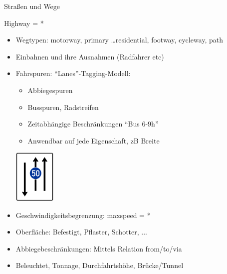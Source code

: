 \documentclass{beamer}
\begin{document}
\begin{frame}{ Straßen und Wege}

Highway = *

\begin{itemize}
  \item Wegtypen: motorway, primary \dots  residential, footway, cycleway, path
  \item Einbahnen und ihre Ausnahmen (Radfahrer etc)
\pause
  \item Fahrspuren: "`Lanes"'-Tagging-Modell:
  \begin{itemize}
    \item Abbiegespuren
    \item Busspuren, Radstreifen
    \item Zeitabhängige Beschränkungen "`Bus 6-9h"'
    \item Anwendbar auf jede Eigenschaft, zB Breite
  \end{itemize}
 \vspace*{-2.6cm}
\hfill\includegraphics[width=2cm]{lanes.png}

\pause
  \item Geschwindigkeitsbegrenzung: maxspeed = *
  \item Oberfläche: Befestigt, Pflaster, Schotter, ...
  \item Abbiegebeschränkungen: Mittels Relation from/to/via
  \item Beleuchtet, Tonnage, Durchfahrtshöhe, Brücke/Tunnel
\end{itemize}

\end{frame}
\end{document}
